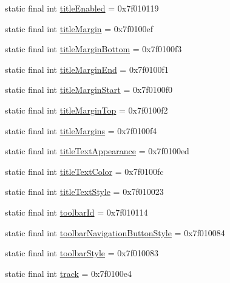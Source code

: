 \begin{CompactItemize}
\item 
static final int \hyperlink{classandroid_1_1support_1_1mediacompat_1_1_r_1_1attr_506c6631e0ca66bdcc5236cbe17dca97}{titleEnabled} = 0x7f010119
\item 
static final int \hyperlink{classandroid_1_1support_1_1mediacompat_1_1_r_1_1attr_45def157a2355ed59f994ace0221b80d}{titleMargin} = 0x7f0100ef
\item 
static final int \hyperlink{classandroid_1_1support_1_1mediacompat_1_1_r_1_1attr_ed88fdeb796aa2998f6a415bae11fd92}{titleMarginBottom} = 0x7f0100f3
\item 
static final int \hyperlink{classandroid_1_1support_1_1mediacompat_1_1_r_1_1attr_ebc1e3e2f1c24076a20111ccd8266de9}{titleMarginEnd} = 0x7f0100f1
\item 
static final int \hyperlink{classandroid_1_1support_1_1mediacompat_1_1_r_1_1attr_6fe0fd44dc88921ba1016919677f3892}{titleMarginStart} = 0x7f0100f0
\item 
static final int \hyperlink{classandroid_1_1support_1_1mediacompat_1_1_r_1_1attr_6ac6c0c6cddaa5ca2867c0a2cdf30cab}{titleMarginTop} = 0x7f0100f2
\item 
static final int \hyperlink{classandroid_1_1support_1_1mediacompat_1_1_r_1_1attr_bfa4db5da2763fb1636c06db4af0582a}{titleMargins} = 0x7f0100f4
\item 
static final int \hyperlink{classandroid_1_1support_1_1mediacompat_1_1_r_1_1attr_4c9b2eafed2e6aaec15f7f474be398fe}{titleTextAppearance} = 0x7f0100ed
\item 
static final int \hyperlink{classandroid_1_1support_1_1mediacompat_1_1_r_1_1attr_d023641d62a5889ed9303e04a319b545}{titleTextColor} = 0x7f0100fc
\item 
static final int \hyperlink{classandroid_1_1support_1_1mediacompat_1_1_r_1_1attr_0609b590ea704bb265fe0dd66046aa17}{titleTextStyle} = 0x7f010023
\item 
static final int \hyperlink{classandroid_1_1support_1_1mediacompat_1_1_r_1_1attr_c17c5c4366cc8ff75f83d2abec1c7806}{toolbarId} = 0x7f010114
\item 
static final int \hyperlink{classandroid_1_1support_1_1mediacompat_1_1_r_1_1attr_c6681818888f00dff27c98c768b77948}{toolbarNavigationButtonStyle} = 0x7f010084
\item 
static final int \hyperlink{classandroid_1_1support_1_1mediacompat_1_1_r_1_1attr_d1ea6dd10891f4ce1d1eac7222560043}{toolbarStyle} = 0x7f010083
\item 
static final int \hyperlink{classandroid_1_1support_1_1mediacompat_1_1_r_1_1attr_d5bf55f6c441a88b23a001967186d0a9}{track} = 0x7f0100e4

\end{CompactItemize}
